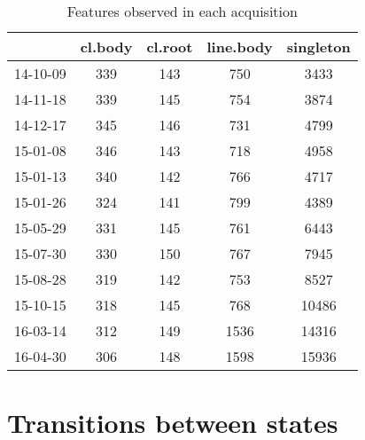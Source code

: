 \documentclass[10pt,fleqn]{article}\usepackage[]{graphicx}\usepackage[]{color}
\begin{document}
\begin{table}
\caption{Features observed in each acquisition}
\begingroup\scriptsize
\begin{tabular}{l|cccc}
  \hline
 & cl.body & cl.root & line.body & singleton \\ 
  \hline
14-10-09 & 339 & 143 & 750 & 3433 \\ 
  14-11-18 & 339 & 145 & 754 & 3874 \\ 
  14-12-17 & 345 & 146 & 731 & 4799 \\ 
  15-01-08 & 346 & 143 & 718 & 4958 \\ 
  15-01-13 & 340 & 142 & 766 & 4717 \\ 
  15-01-26 & 324 & 141 & 799 & 4389 \\ 
  15-05-29 & 331 & 145 & 761 & 6443 \\ 
  15-07-30 & 330 & 150 & 767 & 7945 \\ 
  15-08-28 & 319 & 142 & 753 & 8527 \\ 
  15-10-15 & 318 & 145 & 768 & 10486 \\ 
  16-03-14 & 312 & 149 & 1536 & 14316 \\ 
  16-04-30 & 306 & 148 & 1598 & 15936 \\ 
   \hline
\end{tabular}
\endgroup


\end{table}



\FloatBarrier


\section{Transitions between states}
\end{document}
